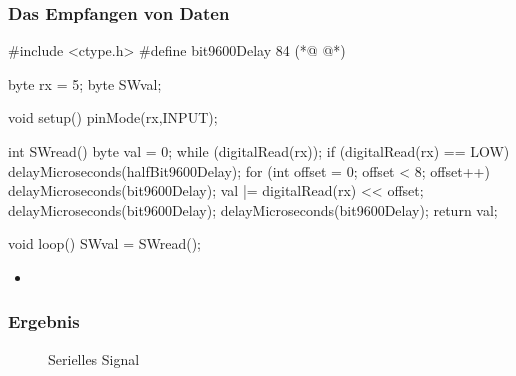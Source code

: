 \subsubsection{Das Empfangen von Daten}

\begin{multicols}{2}
\begin{arduinoCode}{}{}
#include <ctype.h>
#define bit9600Delay 84 (*@  @*)  

byte rx = 5;
byte SWval;

void setup() {
  pinMode(rx,INPUT);
}

int SWread() {
  byte val = 0;
  while (digitalRead(rx));
  if (digitalRead(rx) == LOW) {
    delayMicroseconds(halfBit9600Delay);
    for (int offset = 0; offset < 8; offset++) {
     delayMicroseconds(bit9600Delay);
     val |= digitalRead(rx) << offset;
    }
    delayMicroseconds(bit9600Delay); 
    delayMicroseconds(bit9600Delay);
    return val;
  }
}

void loop()
{
    SWval = SWread(); 
}
\end{arduinoCode}

\vfill
\columnbreak

\begin{itemize}
  \itemsep15pt
  \item[] 
\end{itemize}


\vfill 
\end{multicols}

\subsubsection{Ergebnis}

\begin{figure}[htbp]
  \begin{center}
  \end{center}
  \label{fig:serialW}
  \caption{Serielles Signal}
\end{figure}

